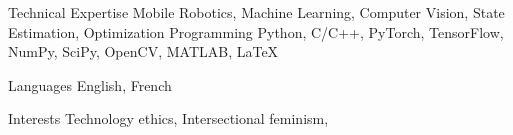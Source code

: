 

\begin{cvskills}

  \cvskill
    {Technical Expertise} %
    {Mobile Robotics, Machine Learning, Computer Vision, State Estimation, Optimization} %
  \cvskill
    {Programming} %
    {Python, C/C++, PyTorch, TensorFlow, NumPy, SciPy, OpenCV, MATLAB, LaTeX} %

  \cvskill
    {Languages} %
    {English, French} %
    
  \cvskill
    {Interests} %
    {Technology ethics, Intersectional feminism, } %

\end{cvskills}
